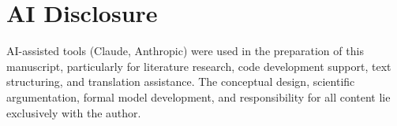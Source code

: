 \documentclass[12pt,a4paper]{article}
\begin{document}
\section*{AI Disclosure}

AI-assisted tools (Claude, Anthropic) were used in the preparation of this manuscript, particularly for literature research, code development support, text structuring, and translation assistance. The conceptual design, scientific argumentation, formal model development, and responsibility for all content lie exclusively with the author.



\end{document}
